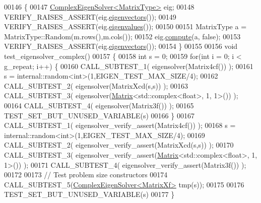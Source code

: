 \begin{DoxyCode}
00146 \{
00147   \hyperlink{group___eigenvalues___module_class_eigen_1_1_complex_eigen_solver}{ComplexEigenSolver<MatrixType>} eig;
00148   VERIFY\_RAISES\_ASSERT(eig.\hyperlink{group___eigenvalues___module_a3aa5e27800349990778da8fa532c1270}{eigenvectors}());
00149   VERIFY\_RAISES\_ASSERT(eig.\hyperlink{group___eigenvalues___module_a10c25c7620e7faedcd39991cce3a757b}{eigenvalues}());
00150 
00151   MatrixType a = MatrixType::Random(m.rows(),m.cols());
00152   eig.\hyperlink{group___eigenvalues___module_aeb7e38c6db5369f5c974f3786e94c1f0}{compute}(a, \textcolor{keyword}{false});
00153   VERIFY\_RAISES\_ASSERT(eig.\hyperlink{group___eigenvalues___module_a3aa5e27800349990778da8fa532c1270}{eigenvectors}());
00154 \}
00155 
00156 \textcolor{keywordtype}{void} test\_eigensolver\_complex()
00157 \{
00158   \textcolor{keywordtype}{int} s = 0;
00159   \textcolor{keywordflow}{for}(\textcolor{keywordtype}{int} i = 0; i < g\_repeat; i++) \{
00160     CALL\_SUBTEST\_1( eigensolver(Matrix4cf()) );
00161     s = internal::random<int>(1,EIGEN\_TEST\_MAX\_SIZE/4);
00162     CALL\_SUBTEST\_2( eigensolver(MatrixXcd(s,s)) );
00163     CALL\_SUBTEST\_3( eigensolver(\hyperlink{group___core___module_class_eigen_1_1_matrix}{Matrix}<std::complex<float>, 1, 1>()) );
00164     CALL\_SUBTEST\_4( eigensolver(Matrix3f()) );
00165     TEST\_SET\_BUT\_UNUSED\_VARIABLE(s)
00166   \}
00167   CALL\_SUBTEST\_1( eigensolver\_verify\_assert(Matrix4cf()) );
00168   s = internal::random<int>(1,EIGEN\_TEST\_MAX\_SIZE/4);
00169   CALL\_SUBTEST\_2( eigensolver\_verify\_assert(MatrixXcd(s,s)) );
00170   CALL\_SUBTEST\_3( eigensolver\_verify\_assert(\hyperlink{group___core___module_class_eigen_1_1_matrix}{Matrix}<std::complex<float>, 1, 1>()) );
00171   CALL\_SUBTEST\_4( eigensolver\_verify\_assert(Matrix3f()) );
00172 
00173   \textcolor{comment}{// Test problem size constructors}
00174   CALL\_SUBTEST\_5(\hyperlink{group___eigenvalues___module_class_eigen_1_1_complex_eigen_solver}{ComplexEigenSolver<MatrixXf>} tmp(s));
00175   
00176   TEST\_SET\_BUT\_UNUSED\_VARIABLE(s)
00177 \}
\end{DoxyCode}
